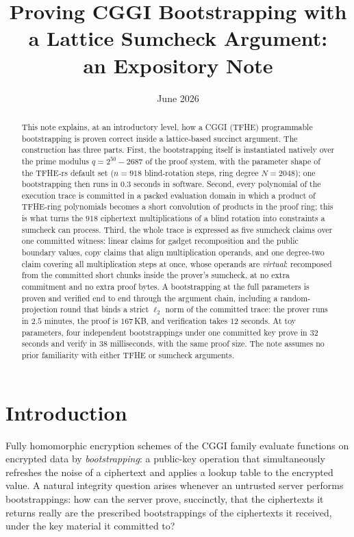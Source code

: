 \documentclass[11pt]{article}
\title{Proving CGGI Bootstrapping with a Lattice Sumcheck Argument:\\ an Expository Note}
\author{}
\date{June 2026}
\begin{document}
\maketitle

\begin{abstract}
This note explains, at an introductory level, how a CGGI (TFHE) programmable bootstrapping is proven correct inside a lattice-based succinct argument. The construction has three parts. First, the bootstrapping itself is instantiated natively over the prime modulus $q = 2^{50} - 2687$ of the proof system, with the parameter shape of the TFHE-rs default set ($n = 918$ blind-rotation steps, ring degree $N = 2048$); one bootstrapping then runs in $0.3$ seconds in software. Second, every polynomial of the execution trace is committed in a packed evaluation domain in which a product of TFHE-ring polynomials becomes a short convolution of products in the proof ring; this is what turns the $918$ ciphertext multiplications of a blind rotation into constraints a sumcheck can process. Third, the whole trace is expressed as five sumcheck claims over one committed witness: linear claims for gadget recomposition and the public boundary values, copy claims that align multiplication operands, and one degree-two claim covering all multiplication steps at once, whose operands are \emph{virtual}: recomposed from the committed short chunks inside the prover's sumcheck, at no extra commitment and no extra proof bytes. A bootstrapping at the full parameters is proven and verified end to end through the argument chain, including a random-projection round that binds a strict $\ell_2$ norm of the committed trace: the prover runs in $2.5$ minutes, the proof is $167$\,KB, and verification takes $12$ seconds. At toy parameters, four independent bootstrappings under one committed key prove in $32$ seconds and verify in $38$ milliseconds, with the same proof size. The note assumes no prior familiarity with either TFHE or sumcheck arguments.
\end{abstract}

\section{Introduction}

Fully homomorphic encryption schemes of the CGGI family \cite{cggi} evaluate functions on encrypted data by \emph{bootstrapping}: a public-key operation that simultaneously refreshes the noise of a ciphertext and applies a lookup table to the encrypted value. A natural integrity question arises whenever an untrusted server performs bootstrappings: how can the server prove, succinctly, that the ciphertexts it returns really are the prescribed bootstrappings of the ciphertexts it received, under the key material it committed to?
\end{document}
